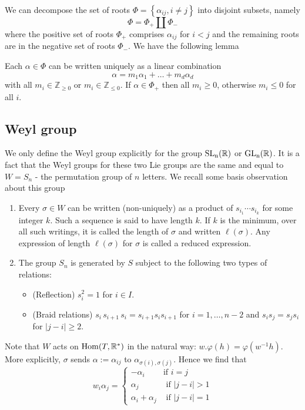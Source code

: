We can decompose the set of roots $\Phi = \left\lbrace \alpha_{ij}, i \ne j\right\rbrace$ into disjoint subsets, namely
\[\Phi = \Phi_+ \coprod \Phi_{-}\]
where the positive set of roots $\Phi_+$  comprises $\alpha_{ij}$ for $i<j$ and the remaining roots are in the negative set of roots $\Phi_{-}$. We have the following lemma
\begin{lemma}\label{linear-comb-of-roots}
    Each $\alpha \in \Phi$ can be written uniquely as a linear combination
    \[\alpha = m_1\alpha_1+\ldots+m_{d}\alpha_{d}\]
    with all $m_i \in \mathbb{Z}_{\ge 0}$ or $m_i \in \mathbb{Z}_{\le 0}$. If $\alpha \in \Phi_+$ then all $m_i \ge 0$, otherwise $m_i \le 0$ for all $i$.
\end{lemma}
\subsection{Weyl group}
We only define the Weyl group explicitly for the group $\operatorname{\text{SL}_n(\mathbb{R})}$ or $\operatorname{\text{GL}_n(\mathbb{R})}$. It is a fact that the Weyl groups for
these two Lie groups are the same and equal to $W = S_n$ - the permutation group of $n$ letters.  We recall some basis
observation about this group
\begin{enumerate}
    \item Every $\sigma \in W$ can be written (non-uniquely) as a product of $s_{i_1} \cdots s_{i_k}$ for some integer $k$. Such a sequence is said to have length $k.$ If $k$ is the minimum, over all such writings, it is called the length of $\sigma$ and written $\ell(\sigma)$. Any expression of length $\ell(\sigma)$ for $\sigma$ is called a reduced expression.

    \item The group $S_n$ is generated by $S$ subject to the following two types of relations:
          \begin{itemize}
              \item (Reflection) $s_i^2=1$ for $i \in I$.
              \item (Braid relations) $s_i \, s_{i+1} \, s_i = s_{i+1}s_i s_{i+1}$ for $i = 1, \ldots, n-2$ and $s_i s_j = s_j s_i$ for $|j -i |\geq 2$.
          \end{itemize}
\end{enumerate}
Note that $W$ acts on $\operatorname{Hom}(T, \mathbb{R}^*)$ in the natural way: $w . \varphi(h) = \varphi(w^{-1} h)$. More explicitly,  $\sigma$ sends $\alpha:= \alpha_{ij}$ to $\alpha_{\sigma(i), \sigma(j)}$. Hence we find that
\[w_i \alpha_j = \begin{cases} - \alpha_i          & \mbox{if } i=j           \\
              \alpha_j            & \mbox{ if } |j - i | > 1 \\
              \alpha_i + \alpha_j & \mbox{ if } |j-i|=1\end{cases} \]


